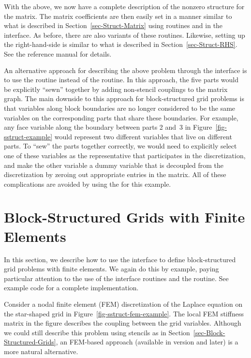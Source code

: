 With the above, we now have a complete description of the nonzero structure for
the matrix.  The matrix coefficients are then easily set in a manner similar to
what is described in Section~\ref{sec-Struct-Matrix} using routines
 and  in the 
interface.  As before, there are also  variants of these routines.
Likewise, setting up the right-hand-side is similar to what is described in
Section~\ref{sec-Struct-RHS}.  See the \hypre{} reference manual for details.

An alternative approach for describing the above problem through the interface
is to use the  routine instead of the
 routine.  In this approach, the five parts would be
explicitly ``sewn'' together by adding non-stencil couplings to the matrix
graph.  The main downside to this approach for block-structured grid problems
is that variables along block boundaries are no longer considered to be the
same variables on the corresponding parts that share these boundaries.  For
example, any face variable along the boundary between parts 2 and~3 in
Figure~\ref{fig-sstruct-example} would represent two different variables that
live on different parts.  To ``sew'' the parts together correctly, we would
need to explicitly select one of these variables as the representative that
participates in the discretization, and make the other variable a dummy
variable that is decoupled from the discretization by zeroing out appropriate
entries in the matrix.  All of these complications are avoided by using the
 for this example.


\section{Block-Structured Grids with Finite Elements}
\label{sec-Block-Structured-Grids-FEM}

In this section, we describe how to use the  interface to define
block-structured grid problems with finite elements.  We again do this by
example, paying particular attention to the use of the  interface
routines and the  routine.  See example code
 for a complete implementation.

Consider a nodal finite element (FEM) discretization of the Laplace equation on
the star-shaped grid in Figure~\ref{fig-sstruct-fem-example}.  The local FEM
stiffness matrix in the figure describes the coupling between the grid
variables.  Although we could still describe this problem using stencils as in
Section~\ref{sec-Block-Structured-Grids}, an FEM-based approach (available in
\hypre{} version  and later) is a more natural alternative.

